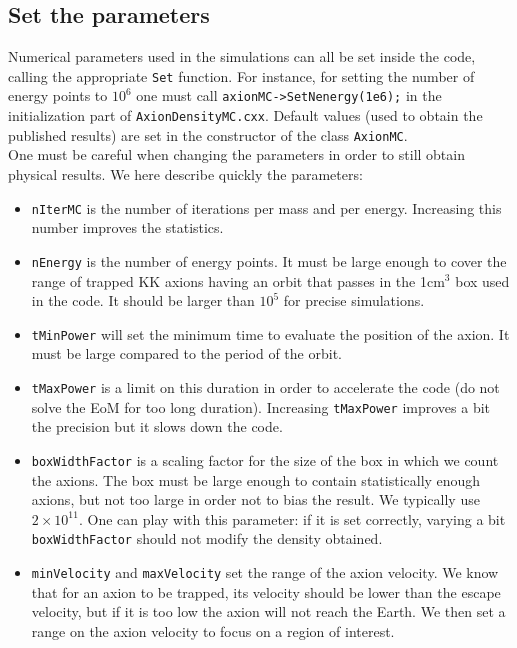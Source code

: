 \documentclass[a4paper]{article} %
\begin{document}
	
\subsection{Set the parameters}

Numerical parameters used in the simulations can all be set inside the code, calling the appropriate \texttt{Set} function. For instance, for setting the number of energy points to $10^6$ one must call \texttt{axionMC->SetNenergy(1e6);} in the initialization part of \texttt{AxionDensityMC.cxx}. Default values (used to obtain the published results) are set in the constructor of the class \texttt{AxionMC}.\\

One must be careful when changing the parameters in order to still obtain physical results. We here describe quickly the parameters:
\begin{itemize}
	\item \texttt{nIterMC} is the number of iterations per mass and per energy. Increasing this number improves the statistics.
	\item \texttt{nEnergy} is the number of energy points. It must be large enough to cover the range of trapped KK axions having an orbit that passes in the 1cm$^3$ box used in the code. It should be larger than $10^5$ for precise simulations.
	\item \texttt{tMinPower} will set the minimum time to evaluate the position of the axion. It must be large compared to the period of the orbit.
	\item \texttt{tMaxPower} is a limit on this duration in order to accelerate the code (do not solve the EoM for too long duration). Increasing \texttt{tMaxPower} improves a bit the precision but it slows down the code.
	\item \texttt{boxWidthFactor} is a scaling factor for the size of the box in which we count the axions. The box must be large enough to contain statistically enough axions, but not too large in order not to bias the result. We typically use $2\times 10 ^{11}$. One can play with this parameter: if it is set correctly, varying a bit \texttt{boxWidthFactor} should not modify the density obtained.
	\item  \texttt{minVelocity} and \texttt{maxVelocity} set the range of the axion velocity. We know that for an axion to be trapped, its velocity should be lower than the escape velocity, but if it is too low the axion will not reach the Earth. We then set a range on the axion velocity to focus on a region of interest.
\end{itemize}
\end{document}
